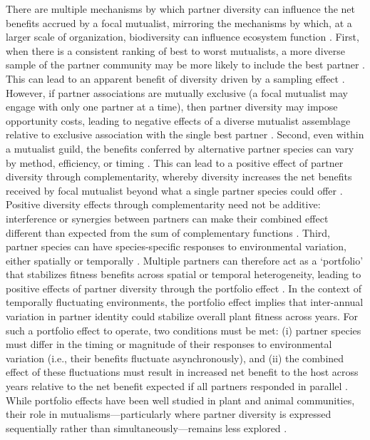 \documentclass[11pt]{article}
\begin{document}
There are multiple mechanisms by which partner diversity can influence the net benefits accrued by a focal mutualist, mirroring the mechanisms by which, at a larger scale of organization, biodiversity can influence ecosystem function \citep{Barrett2015,Ushio2020,Winfree2020}. 
First, when there is a consistent ranking of best to worst mutualists, a more diverse sample of the partner community may be more likely to include the best partner \citep{Frederickson2013}. 
This can lead to an apparent benefit of diversity driven by a sampling effect \citep{Batstone2018}.  
However, if partner associations are mutually exclusive (a focal mutualist may engage with only one partner at a time), then partner diversity may impose opportunity costs, leading to negative effects of a diverse mutualist assemblage relative to exclusive association with the single best partner \citep{Miller2007}. 
Second, even within a mutualist guild, the benefits conferred by alternative partner species can vary by method, efficiency, or timing \citep{Stachowicz2005,Bronstein2006,Stanton2003}. 
This can lead to a positive effect of partner diversity through complementarity, whereby diversity increases the net benefits received by focal mutualist beyond what a single partner species could offer \citep{Batstone2018}.
Positive diversity effects through complementarity need not be additive: interference or synergies between partners can make their combined effect different than expected from the sum of complementary functions \citep{Afkhami2014}. 
Third, partner species can have species-specific responses to environmental variation, either spatially \citep{Ollerton2006} or temporally \citep{Alarcon2008}. 
Multiple partners can therefore act as a `portfolio' that stabilizes fitness benefits across spatial or temporal heterogeneity, leading to positive effects of partner diversity through the portfolio effect \citep{Batstone2018,Lazaro2022,Horvitz1990}. 
In the context of temporally fluctuating environments, the portfolio effect implies that inter-annual variation in partner identity could stabilize overall plant fitness across years. 
For such a portfolio effect to operate, two conditions must be met: (i) partner species must differ in the timing or magnitude of their responses to environmental variation (i.e., their benefits fluctuate asynchronously), and (ii) the combined effect of these fluctuations must result in increased net benefit to the host across years relative to the net benefit expected if all partners responded in parallel \citep{Loreau1999, Tilman1994, Hautier2014}. 
While portfolio effects have been well studied in plant and animal communities, their role in mutualisms—particularly where partner diversity is expressed sequentially rather than simultaneously—remains less explored \citep{Ushio2020}.
\end{document}
